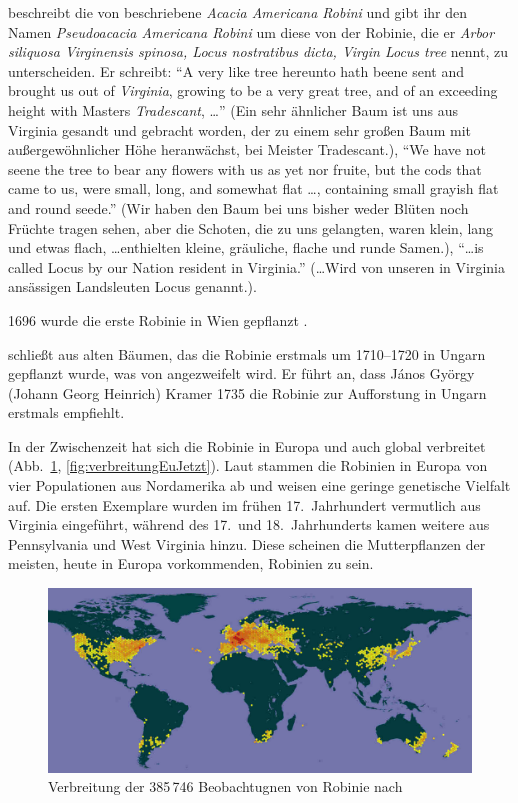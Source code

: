 \documentclass[twocolumn]{scrartcl}
\begin{document}
\citet[S.~1550]{parkinson1640theatrumBotanicum} beschreibt die von
\cite{cornuti1635robinie} beschriebene \emph{Acacia Americana Robini}
und gibt ihr den Namen \emph{Pseudoacacia Americana Robini} um diese
von der Robinie, die er \emph{Arbor siliquosa Virginensis spinosa,
Locus nostratibus dicta, Virgin Locus tree} nennt, zu
unterscheiden. Er schreibt: \enquote{A very like tree hereunto hath beene sent and brought us out of \emph{Virginia}, growing to be a very great tree, and of an exceeding height with Masters \emph{Tradescant}, \dots}
(Ein sehr ähnlicher Baum ist uns aus Virginia gesandt und gebracht worden, der zu einem sehr großen Baum mit außergewöhnlicher Höhe heranwächst, bei Meister Tradescant.),
\enquote{We have not seene the tree to bear any flowers with us as yet nor fruite, but the cods that came to us, were small, long, and somewhat flat \dots, containing small grayish flat and round seede.}
(Wir haben den Baum bei uns bisher weder Blüten noch Früchte tragen sehen, aber die Schoten, die zu uns gelangten, waren klein, lang und etwas flach, \dots enthielten kleine, gräuliche, flache und runde Samen.),
\enquote{\dots is called Locus by our Nation resident in Virginia.}
(\dots Wird von unseren in Virginia ansässigen Landsleuten Locus genannt.).

1696 wurde die erste Robinie in Wien gepflanzt
\citep[S.~147]{loudon1838arboretum1}.

\citet[S.~3]{vadas1911robinie} schließt aus alten Bäumen, das
die Robinie erstmals um 1710--1720 in Ungarn gepflanzt wurde, was von
\citet[S.~179]{ernyey1926robinie} angezweifelt wird. Er führt an, dass
János György (Johann Georg Heinrich) Kramer 1735 die Robinie zur
Aufforstung in Ungarn erstmals empfiehlt.

In der Zwischenzeit hat
sich die Robinie in Europa und auch global verbreitet
(Abb.~\ref{fig:verbreitungGlob}, \ref{fig:verbreitungEuJetzt}). Laut
\cite{bouteiller2019robinie} stammen die Robinien in Europa von vier
Populationen aus Nordamerika ab und weisen eine geringe genetische
Vielfalt auf. Die ersten Exemplare wurden im frühen 17.\ Jahrhundert
vermutlich aus Virginia eingeführt, während des 17.\ und
18.\ Jahrhunderts kamen weitere aus Pennsylvania und West Virginia
hinzu. Diese scheinen die Mutterpflanzen der meisten, heute in Europa
vorkommenden, Robinien zu sein.

\begin{figure}[htbp]
  \centering
  \includegraphics[width=.9\linewidth]{./bild/verbreitungRobGlob}
  \caption{Verbreitung der 385\,746 Beobachtugnen von Robinie nach \cite{gbifRob}}
  \label{fig:verbreitungGlob}
\end{figure}
\end{document}

